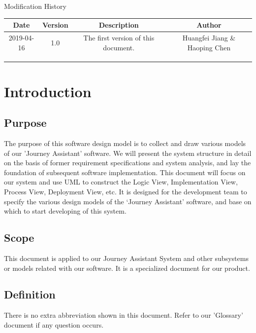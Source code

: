 \documentclass[10pt]{article}
\begin{document}
\newpage

\begin{center}
    {\LARGE Modification History}
    
    \begin{tabular}{|c|c|c|c|} 
        \hline 
        Date&Version&Description&Author\\
        \hline  
        2019-04-16&1.0&The first version of this document.&Huangfei Jiang \& Haoping Chen\\
		\hline 
		&&&\\
		\hline
		& & & \\
		\hline
		& & & \\
		\hline
    \end{tabular}    
\end{center}

\newpage

\tableofcontents
\newpage

\section{Introduction}
\subsection{Purpose}
The purpose of this software design model is to collect and draw various models of our 'Journey Assistant' software. We will present the system structure in detail on the basis of former requirement specifications and system analysis, and lay the foundation of subsequent software implementation. This document will focus on our system and use UML to construct the Logic View, Implementation View, Process View, Deployment View, etc. It is designed for the development team to specify the various design models of the ‘Journey Assistant’ software, and base on which to start developing of this system.

\subsection{Scope}
This document is applied to our Journey Assistant System and other subsystems or models related with our software. It is a specialized document for our product.

\subsection{Definition}
There is no extra abbreviation shown in this document. Refer to our 'Glossary' document if any question occurs.
\end{document}
